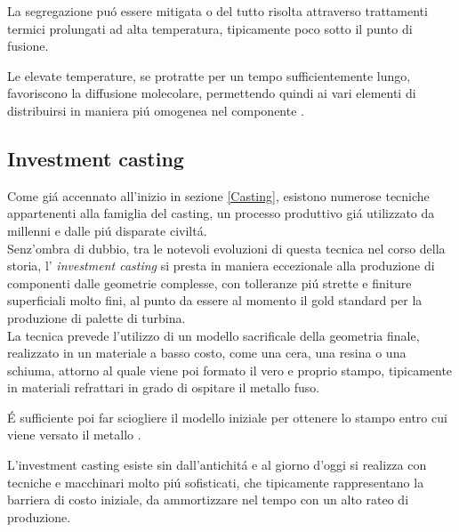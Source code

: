 \documentclass{article}
\begin{document}
            La segregazione puó essere mitigata o del tutto risolta attraverso trattamenti termici prolungati ad alta temperatura,
            tipicamente poco sotto il punto di fusione. 

            Le elevate temperature, se protratte per un tempo sufficientemente lungo, favoriscono la diffusione
            molecolare, permettendo quindi ai vari elementi di distribuirsi in maniera piú omogenea nel componente \autocite{Mouritz}. 


    
            \clearpage

        \subsection{Investment casting\label{Casting_investment}}

        Come giá accennato all'inizio in sezione \ref{Casting}, esistono numerose tecniche 
        appartenenti alla famiglia del casting, un processo produttivo giá utilizzato da millenni 
        e dalle piú disparate civiltá. \\ 

        Senz'ombra di dubbio, tra le notevoli evoluzioni di questa tecnica nel corso della storia, l'
        \textit{investment casting} si presta in maniera eccezionale alla produzione di componenti
        dalle geometrie complesse, con tolleranze piú strette e finiture superficiali molto fini, 
        al punto da essere al momento il gold standard per la produzione di palette di turbina. \\

        La tecnica prevede l'utilizzo di un modello sacrificale della geometria
        finale, realizzato in un materiale a basso costo, come
        una cera, una resina o una schiuma, attorno al quale viene poi formato il vero e proprio stampo, 
        tipicamente in materiali refrattari in grado di ospitare il metallo fuso.

        É sufficiente poi far sciogliere il modello iniziale per ottenere lo stampo entro cui 
        viene versato il metallo \autocite{Mouritz}.

        L'investment casting esiste sin dall'antichitá e al giorno d'oggi si realizza con
        tecniche e macchinari molto piú sofisticati, che tipicamente rappresentano la barriera di costo
        iniziale, da ammortizzare nel tempo con un alto rateo di produzione.  \\ 
\end{document}
